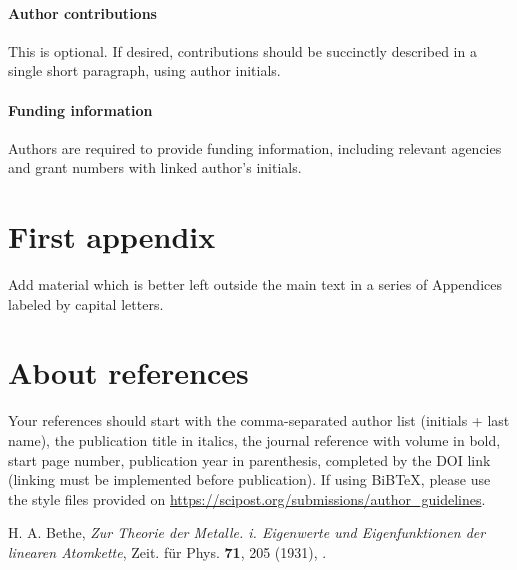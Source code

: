 \documentclass[submission]{SciPost}
\begin{document}
\paragraph{Author contributions}
This is optional. If desired, contributions should be succinctly described in a single short paragraph, using author initials.

\paragraph{Funding information}
Authors are required to provide funding information, including relevant agencies and grant numbers with linked author's initials.


\begin{appendix}

\section{First appendix}
Add material which is better left outside the main text in a series of Appendices labeled by capital letters.

\section{About references}
Your references should start with the comma-separated author list (initials + last name), the publication title in italics, the journal reference with volume in bold, start page number, publication year in parenthesis, completed by the DOI link (linking must be implemented before publication). If using BiBTeX, please use the style files provided  on \url{https://scipost.org/submissions/author_guidelines}. 
\end{appendix}

\begin{thebibliography}{99}
 H. A. Bethe, {\it Zur Theorie der Metalle. i. Eigenwerte und Eigenfunktionen der linearen Atomkette}, Zeit. f{\"u}r Phys. {\bf 71}, 205 (1931), .
\end{thebibliography}

\nolinenumbers
\end{document}

